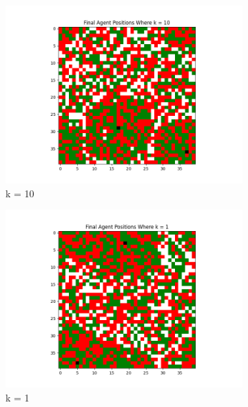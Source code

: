 \documentclass[11pt]{article}
\begin{document}
	\begin{figure}[h]
		\centering
		\begin{subfigure}{0.2\textwidth}
			\includegraphics[width=\linewidth]{policy3_Final_10.png}
			\caption{\centering k = 10}
			\label{p3_final_10}
		\end{subfigure}\hfill
		\begin{subfigure}{0.2\textwidth}
			\includegraphics[width=\linewidth]{policy3_Final_1.png}
			\caption{\centering k = 1}
		\end{subfigure}\hfill
		\begin{subfigure}{0.2\textwidth}

\end{subfigure}
\end{figure}
\end{document}
